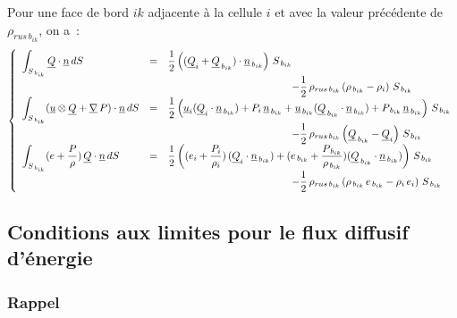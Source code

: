 Pour une face de bord $ik$ adjacente \`a la cellule $i$ et
avec la valeur pr\'ec\'edente de $\rho_{rus\,{b}_{ik}}$, on a~:
\begin{equation}
\left\{\begin{array}{lll}
\displaystyle\int_{S_{\,{b}_{ik}}}\vect{Q}\cdot\vect{n}\,dS
&=&
\displaystyle\frac{1}{2}\left(
(\vect{Q}_i+\vect{Q}_{\,{b}_{ik}})\cdot\vect{n}_{\,{b}_{ik}}\right)\,S_{\,{b}_{ik}}\\
&&\displaystyle \qquad\qquad\qquad\qquad\qquad\qquad
-\frac{1}{2}\,\rho_{rus\,{b}_{ik}}
\left(\rho_{\,{b}_{ik}}-\rho_i \right)\,S_{\,{b}_{ik}}\\
%
\displaystyle\int_{S_{\,{b}_{ik}}}(\vect{u}\otimes\vect{Q}+\grad\,P)\cdot\vect{n}\,dS
&=&
\displaystyle\frac{1}{2}\left(
 \vect{u}_i(\vect{Q}_i\cdot\vect{n}_{\,{b}_{ik}})
+P_i\,\vect{n}_{\,{b}_{ik}}
+\vect{u}_{\,{b}_{ik}}(\vect{Q}_{\,{b}_{ik}}\cdot\vect{n}_{\,{b}_{ik}})
+P_{\,{b}_{ik}}\,\vect{n}_{\,{b}_{ik}}\right)\,S_{\,{b}_{ik}}\\
&&\displaystyle \qquad\qquad\qquad\qquad\qquad\qquad
-\frac{1}{2}\,\rho_{rus\,{b}_{ik}}
\left(\vect{Q}_{\,{b}_{ik}}-\vect{Q}_i \right)\,S_{\,{b}_{ik}}\\
%
\displaystyle\int_{S_{\,{b}_{ik}}}(e+\frac{P}{\rho})\,\vect{Q}\cdot\vect{n}\,dS
&=&
\displaystyle\frac{1}{2}\left(
(e_i+\frac{P_i}{\rho_i})\,(\vect{Q}_i\cdot\vect{n}_{\,{b}_{ik}})
+(e_{\,{b}_{ik}}+\frac{P_{\,{b}_{ik}}}{\rho_{\,{b}_{ik}}})(\vect{Q}_{\,{b}_{ik}}\cdot\vect{n}_{\,{b}_{ik}})
\right)\,S_{\,{b}_{ik}}\\
&&\displaystyle \qquad\qquad\qquad\qquad\qquad\qquad
-\frac{1}{2}\,\rho_{rus\,{b}_{ik}}
\left(\rho_{\,{b}_{ik}}\,e_{\,{b}_{ik}}-\rho_i\,e_i \right)\,S_{\,{b}_{ik}}\\
\end{array}\right.
\end{equation}



\subsection*{Conditions aux limites pour le flux diffusif d'\'energie}
\label{Cfbl_Cfxtcl_section_cl_flux_diffusif_energie_cfener}

\subsubsection*{Rappel}


